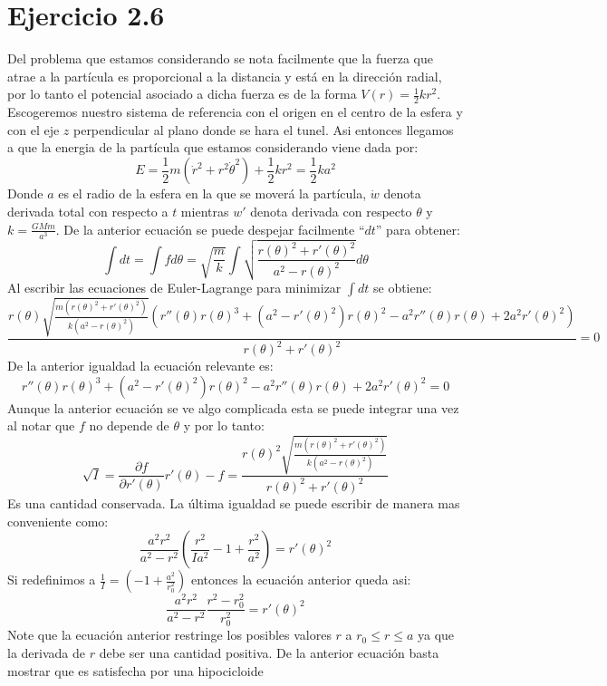\documentclass[letterpaper,10pt]{article}
\begin{document}
\section*{Ejercicio 2.6}
Del problema que estamos considerando se nota facilmente que la fuerza que atrae a la part\'icula es proporcional a la distancia y est\'a en la direcci\'on radial, por lo tanto el potencial asociado a dicha fuerza es de la forma $V(r)=\frac{1}{2} k r^2$. Escogeremos nuestro sistema de referencia con el origen en el centro de la esfera y con el eje $z$ perpendicular al plano donde se hara el tunel. Asi entonces llegamos a que la energia de la part\'icula que estamos considerando viene dada por:
$$E=\frac{1}{2}m (\dot r^2+r^2 \dot \theta^2)+\frac{1}{2} k r^2=\frac{1}{2}k a^2$$
Donde $a$ es el radio de la esfera en la que se mover\'a la part\'icula, $\dot w$ denota derivada total con respecto a $t$ mientras $w'$ denota derivada con respecto $\theta$ y $k=\frac{G M m}{a^3}$. De la anterior ecuaci\'on se puede despejar facilmente ``$dt$'' para obtener:
$$\int dt=\int f d\theta=\sqrt{\frac{m}{k}}\int \sqrt{\frac{r(\theta )^2+r'(\theta )^2}{a^2 - r(\theta
   )^2}} d \theta$$
Al escribir las ecuaciones de Euler-Lagrange para minimizar $\int dt$ se obtiene:
$$\frac{r(\theta ) \sqrt{\frac{m \left(r(\theta
   )^2+r'(\theta )^2\right)}{k \left(a^2-r(\theta
   )^2\right)}} \left(r''(\theta ) r(\theta
   )^3+\left(a^2-r'(\theta )^2\right) r(\theta )^2-a^2
   r''(\theta ) r(\theta )+2 a^2 r'(\theta
   )^2\right)}{r(\theta )^2+r'(\theta )^2}=0$$
De la anterior igualdad la ecuaci\'on relevante es:
$$r''(\theta ) r(\theta )^3+\left(a^2-r'(\theta )^2\right)
   r(\theta )^2-a^2 r''(\theta ) r(\theta )+2 a^2
   r'(\theta )^2=0$$
Aunque la anterior ecuaci\'on se ve algo complicada esta se puede integrar una vez al notar que $f$ no depende de $\theta$ y por lo tanto:
$$\sqrt{I}=\frac{\partial f}{\partial r'(\theta)} r'(\theta)-f=\frac{r(\theta )^2 \sqrt{\frac{m \left(r(\theta
   )^2+r'(\theta )^2\right)}{k \left(a^2-r(\theta
   )^2\right)}}}{r(\theta )^2+r'(\theta )^2}$$
Es una cantidad conservada. La \'ultima igualdad se puede escribir de manera mas conveniente como:
$$\frac{a^2 r^2}{a^2-r^2}\left(\frac{r^2}{I a^2}-1+\frac{r^2}{a^2}  \right)=r'(\theta)^2$$
Si redefinimos a $\frac{1}{I}=\left(-1+\frac{a^2}{r_0^2} \right)$ entonces la ecuaci\'on anterior queda asi:
$$\frac{a^2 r^2}{a^2-r^2}\frac{r^2-r_0^2}{r_0^2}=r'(\theta)^2$$ 
Note que la ecuaci\'on anterior restringe los posibles valores $r$ a $r_0\leq r \leq a$ ya que la derivada de $r$ debe ser una cantidad positiva.
De la anterior ecuaci\'on basta mostrar que es satisfecha por una hipocicloide
\end{document}
